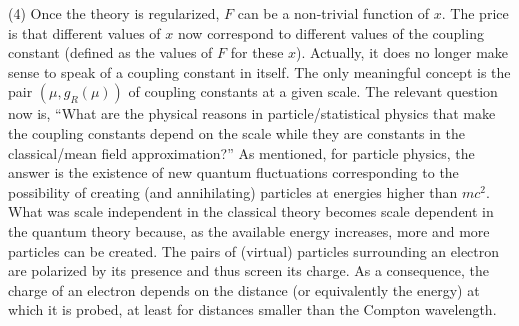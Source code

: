 \documentclass[floatfix,preprintnumbers,amsmath,amssymb,prb,12pt]{revtex4-1}
\begin{document}
{(4) Once the theory is regularized, $F$ can be a non-trivial
function of $x$. The price is that different values
of $x$ now correspond to different values of the coupling constant
(defined as the values of $F$ for these $x$). Actually, it does
no longer make sense to speak of a coupling constant in itself.
The only meaningful concept is the pair $(\mu,g_R(\mu))$
of coupling constants at a given scale. The relevant question
now is, ``What are the physical reasons in particle/statistical
physics that make the coupling constants depend on the scale while
they are constants in the classical/mean field approximation?'' As 
mentioned, for particle physics, the answer is the existence of
new quantum fluctuations corresponding to the possibility of
creating (and annihilating) particles at energies higher than $m
c^2$. What was scale independent in the classical theory becomes
scale dependent in the quantum theory because, as the available
energy increases, more and more particles can be created. The
pairs of (virtual) particles surrounding an electron are polarized
by its presence and thus screen its charge. As a consequence, the
charge of an electron depends on the distance (or equivalently the
energy) at which it is probed, at least for distances smaller than
the Compton wavelength. 

}
\end{document}
